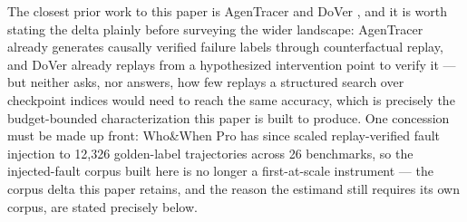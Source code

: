 \documentclass[11pt]{article}
\begin{document}
The closest prior work to this paper is AgenTracer \citep{AgenTracer2025} and DoVer \citep{DoVer2025}, and it is worth stating the delta plainly before surveying the wider landscape: AgenTracer already generates causally verified failure labels through counterfactual replay, and DoVer already replays from a hypothesized intervention point to verify it --- but neither asks, nor answers, how few replays a structured search over checkpoint indices would need to reach the same accuracy, which is precisely the budget-bounded characterization this paper is built to produce. One concession must be made up front: Who\&When Pro \citep{WhoWhenPro2607} has since scaled replay-verified fault injection to 12{,}326 golden-label trajectories across 26 benchmarks, so the injected-fault corpus built here is no longer a first-at-scale instrument --- the corpus delta this paper retains, and the reason the estimand still requires its own corpus, are stated precisely below.
\end{document}
